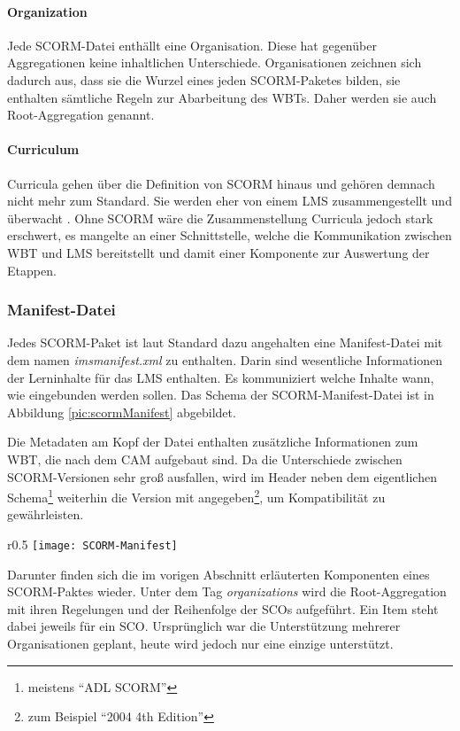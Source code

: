 \paragraph{Organization}
Jede SCORM-Datei enthällt eine Organisation. Diese hat gegenüber Aggregationen
keine inhaltlichen Unterschiede. Organisationen zeichnen sich dadurch aus, dass
sie die Wurzel eines jeden SCORM-Paketes bilden, sie enthalten sämtliche Regeln
zur Abarbeitung des WBTs. Daher werden sie auch Root-Aggregation genannt.
\cite{adl:2011}

\paragraph{Curriculum}
Curricula gehen über die Definition von SCORM hinaus und gehören demnach nicht
mehr zum Standard. Sie werden eher von einem LMS zusammengestellt und überwacht
\cite{adl:2011}. Ohne SCORM wäre die Zusammenstellung Curricula jedoch stark
erschwert, es mangelte an einer Schnittstelle, welche die Kommunikation zwischen
WBT und LMS bereitstellt und damit einer Komponente zur Auswertung der
Etappen.

\subsubsection{Manifest-Datei}
Jedes SCORM-Paket ist laut Standard dazu angehalten eine Manifest-Datei mit dem
namen \textit{imsmanifest.xml} zu enthalten. Darin sind wesentliche
Informationen der Lerninhalte für das LMS enthalten. Es kommuniziert welche
Inhalte wann, wie eingebunden werden sollen. Das Schema der SCORM-Manifest-Datei
ist in Abbildung \ref{pic:scormManifest} abgebildet.

Die Metadaten am Kopf der Datei enthalten zusätzliche Informationen zum WBT, die
nach dem \ac{CAM} aufgebaut sind. Da die Unterschiede zwischen
SCORM-Versionen sehr groß ausfallen, wird im Header neben dem
eigentlichen Schema\footnote{meistens "`ADL SCORM"'} weiterhin die Version
mit angegeben\footnote{zum Beispiel "`2004 4th Edition"'}, um Kompatibilität zu
gewährleisten. 

\begin{wrapfigure}{r}{0.5\textwidth}
\texttt{[image: SCORM-Manifest]}
\vspace{-30pt}
\caption{Schema der SCORM-Manifest Datei\footnotemark}\label{pic:scormManifest}
\vspace{-20pt} 
\end{wrapfigure}
Darunter finden sich die im vorigen Abschnitt erläuterten Komponenten eines
SCORM-Paktes wieder. Unter dem Tag \textit{organizations} wird die
Root-Aggregation mit ihren Regelungen und der Reihenfolge der SCOs aufgeführt. Ein
Item steht dabei jeweils für ein SCO. Ursprünglich war die Unterstützung
mehrerer Organisationen geplant, heute wird jedoch nur eine einzige unterstützt.

